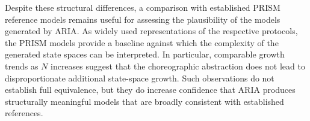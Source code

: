 Despite these structural differences, a comparison with established PRISM reference models remains useful for assessing the plausibility of the models generated by \textsc{ARIA}. As widely used representations of the respective protocols, the PRISM models provide a baseline against which the complexity of the generated state spaces can be interpreted. In particular, comparable growth trends as $N$ increases suggest that the choreographic abstraction does not lead to disproportionate additional state-space growth. Such observations do not establish full equivalence, but they do increase confidence that \textsc{ARIA} produces structurally meaningful models that are broadly consistent with established references.
